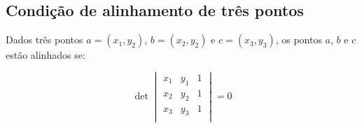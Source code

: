\subsection{Condição de alinhamento de três pontos}

Dados três pontos $a = (x_1,y_2)$, $b = (x_2,y_2)$ e $c = (x_3,y_3)$, os pontos $a$, $b$ e $c$ estão alinhados se:

\[
\det
\begin{vmatrix}
x_1 & y_1 & 1 \\
x_2 & y_2 & 1 \\
x_3 & y_3 & 1 \\
\end{vmatrix} = 0
\]